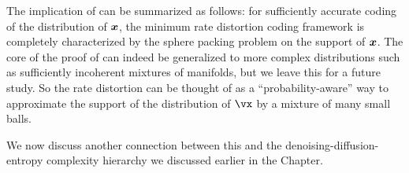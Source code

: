 \documentclass[../../book-main.tex]{subfiles}
\begin{document}
The implication of  can be summarized
as follows: for sufficiently accurate coding of the distribution of
$\bm{x}$, the minimum rate distortion coding framework is completely characterized
by the sphere packing problem on the support of $\bm{x}$. 
The core of the proof of  can indeed
be generalized to more complex distributions such as sufficiently incoherent
mixtures of manifolds, but we leave this for a future study.
So the rate distortion can be thought of as a ``probability-aware'' way to
approximate the support of the distribution of
\(\vx\) by a mixture of many small balls.

We now discuss another connection between this and the
denoising-diffusion-entropy complexity hierarchy we discussed earlier in the
Chapter.
\end{document}
